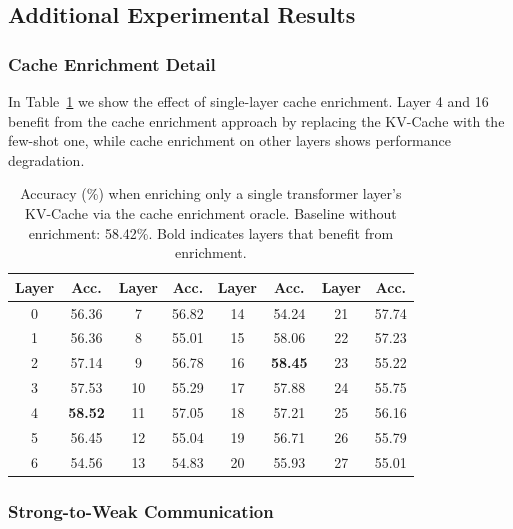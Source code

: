 \subsection{Additional Experimental Results}
\label{sec:appendix/exp}

\subsubsection{Cache Enrichment Detail}
\label{sec:appendix/exp/oracle1}

In Table~\ref{tab:single_layer_aug} we show the effect of single-layer cache enrichment. Layer 4 and 16 benefit from the cache enrichment approach by replacing the KV-Cache with the few-shot one, while cache enrichment on other layers shows performance degradation. 
\begin{table}[h]
\centering
\caption{Accuracy (\%) when enriching only a single transformer layer's KV-Cache via the cache enrichment oracle. Baseline without enrichment: 58.42\%. Bold indicates layers that benefit from enrichment.}
\label{tab:single_layer_aug}
\setlength{\tabcolsep}{4pt} %
\begin{tabular}{c c | c c | c c | c c}
\toprule
\textbf{Layer} & \textbf{Acc.} &
\textbf{Layer} & \textbf{Acc.} &
\textbf{Layer} & \textbf{Acc.} &
\textbf{Layer} & \textbf{Acc.} \\
\midrule
0  & 56.36 & 7  & 56.82 & 14 & 54.24 & 21 & 57.74 \\
1  & 56.36 & 8  & 55.01 & 15 & 58.06 & 22 & 57.23 \\
2  & 57.14 & 9  & 56.78 & 16 & \textbf{58.45} & 23 & 55.22 \\
3  & 57.53 & 10 & 55.29 & 17 & 57.88 & 24 & 55.75 \\
4  & \textbf{58.52} & 11 & 57.05 & 18 & 57.21 & 25 & 56.16 \\
5  & 56.45 & 12 & 55.04 & 19 & 56.71 & 26 & 55.79 \\
6  & 54.56 & 13 & 54.83 & 20 & 55.93 & 27 & 55.01 \\
\bottomrule
\end{tabular}
\end{table}


\subsubsection{Strong-to-Weak Communication}
\label{sec:appendix/exp/strong2weak}

